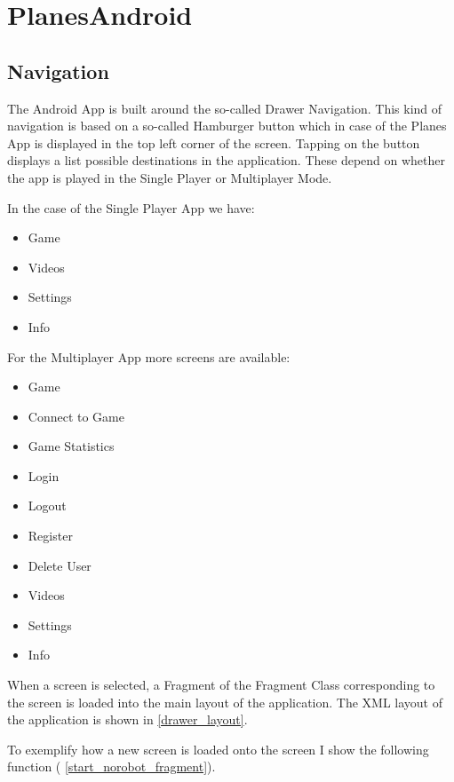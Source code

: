 \section{ PlanesAndroid }

\subsection { Navigation }

The Android App is built around the so-called Drawer Navigation. This kind of navigation is based on a so-called Hamburger button which in case of the Planes App is displayed in the top left corner of the screen. Tapping on the button displays a list possible destinations in the application. These depend on whether the app is played in the Single Player or Multiplayer Mode. 

In the case of the Single Player App we have:
\begin{itemize}
\item Game
\item Videos
\item Settings
\item Info
\end{itemize}

For the Multiplayer App more screens are available:

\begin{itemize}
	\item Game
	\item Connect to Game
	\item Game Statistics
	\item Login
	\item Logout
	\item Register
	\item Delete User
	\item Videos
	\item Settings
	\item Info
\end{itemize}

When a screen is selected, a Fragment of the Fragment Class corresponding to the screen is loaded into the main layout of the application. The XML layout of the application is shown in \ref{drawer_layout}.

To exemplify how a new screen is loaded onto the screen I show the following function ( \ref{start_norobot_fragment}).

